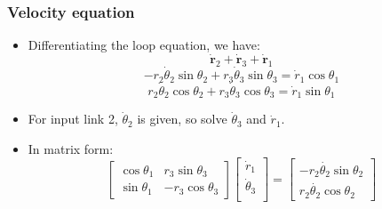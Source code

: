 \documentclass[11pt]{article}
\begin{document}
\subsubsection{Velocity equation}
\label{sec:org017baed}
\begin{itemize}
\item Differentiating the loop equation, we have:
\[\dot{\boldsymbol{r}}_2 + \dot{\boldsymbol{r}}_3 + \dot{\boldsymbol{r}}_1\]
\[-r_2 \dot{\theta}_2 \sin \theta_2 + r_3 \dot{\theta}_3 \sin \theta_3 = \dot{r}_1 \cos \theta_1\]
\[r_2 \dot{\theta}_2 \cos \theta_2 + r_3 \dot{\theta}_3 \cos \theta_3 = \dot{r}_1 \sin \theta_1\]
\item For input link 2, \(\dot{\theta}_2\) is given, so solve \(\dot{\theta}_3\) and \(\dot{r}_1\).
\item In matrix form:
\begin{displaymath}
\begin{bmatrix}
\cos \theta_1 & r_3 \sin \theta_3 \\
\sin \theta_1 & -r_3 \cos \theta_3
\end{bmatrix}
\begin{bmatrix}
\dot{r}_1 \\
\dot{\theta}_3 \\
\end{bmatrix} = \begin{bmatrix}
-r_2 \dot{\theta_2} \sin \theta_2 \\
r_2 \dot{\theta_2} \cos \theta_2
\end{bmatrix}
\end{displaymath}
\end{itemize}
\end{document}
